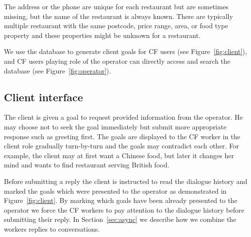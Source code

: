 \documentclass[runningheads,a4paper]{llncs}
\begin{document}
The address or the phone are unique for each restaurant but are sometimes missing, but the name of the restaurant is always known. 
There are typically multiple restaurant with the same postcode, price range, area, or food type property and these properties might be unknown for a restaurant.

We use the database to generate client goals for CF users (see Figure~\ref{fig:client}), and CF users playing role of the operator can directly access and search the database (see Figure~\ref{fig:operator}).

\vspace{-1.00em}
\subsection{Client interface}
\label{sec:client}

The client is given a goal to request provided information from the operator.
He may choose not to seek the goal immediately but submit more appropriate response such as greeting first.
The goals are displayed to the CF worker in the client role gradually turn-by-turn and the goals may contradict each other.
For example, the client may at first want a Chinese food, but later it changes her mind and wants to find restaurant serving British food.

Before submitting a reply the client is instructed to read the dialogue history and marked the goals which were presented to the operator as demonstrated in Figure~\ref{fig:client}.
By marking which goals have been already presented to the operator we force the CF workers to pay attention to the dialogue history before submitting their reply.
In Section~\ref{sec:async} we describe how we combine the workers replies to conversations.
\end{document}
